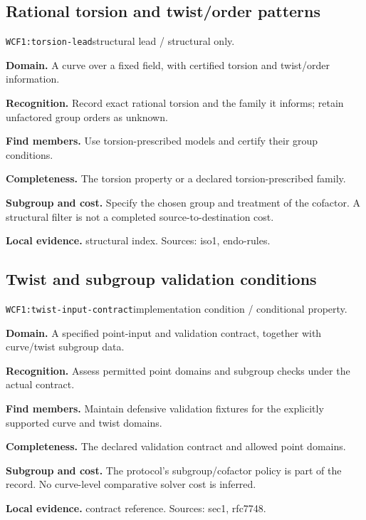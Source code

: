 \documentclass[10pt]{article}
\begin{document}
\subsection{Rational torsion and twist/order patterns}
\texttt{WCF1:torsion-lead}\quad structural lead / structural only.\par
\textbf{Domain.} A curve over a fixed field, with certified torsion and twist/order information.\par
\textbf{Recognition.} Record exact rational torsion and the family it informs; retain unfactored group orders as unknown.\par
\textbf{Find members.} Use torsion-prescribed models and certify their group conditions.\par
\textbf{Completeness.} The torsion property or a declared torsion-prescribed family.\par
\textbf{Subgroup and cost.} Specify the chosen group and treatment of the cofactor. A structural filter is not a completed source-to-destination cost.\par
\textbf{Local evidence.} structural index. Sources: iso1, endo-rules.
\subsection{Twist and subgroup validation conditions}
\texttt{WCF1:twist-input-contract}\quad implementation condition / conditional property.\par
\textbf{Domain.} A specified point-input and validation contract, together with curve/twist subgroup data.\par
\textbf{Recognition.} Assess permitted point domains and subgroup checks under the actual contract.\par
\textbf{Find members.} Maintain defensive validation fixtures for the explicitly supported curve and twist domains.\par
\textbf{Completeness.} The declared validation contract and allowed point domains.\par
\textbf{Subgroup and cost.} The protocol's subgroup/cofactor policy is part of the record. No curve-level comparative solver cost is inferred.\par
\textbf{Local evidence.} contract reference. Sources: sec1, rfc7748.
\end{document}
